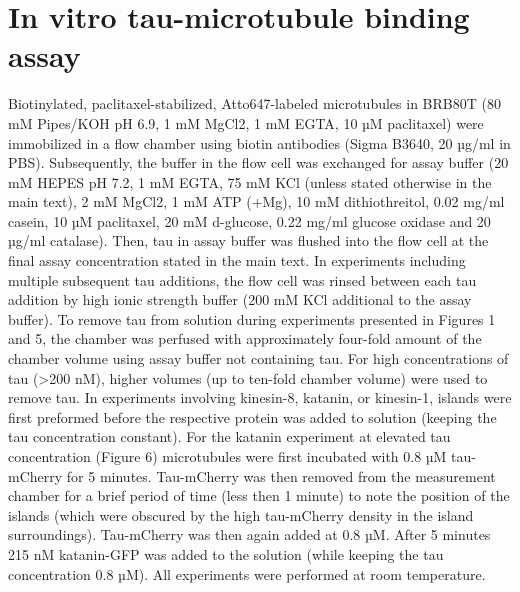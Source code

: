 \section{In vitro tau-microtubule binding assay}
Biotinylated, paclitaxel-stabilized, Atto647-labeled microtubules in BRB80T (80 mM Pipes/KOH pH 6.9, 1 mM MgCl2, 1 mM EGTA, 10 µM paclitaxel) were immobilized in a flow chamber using biotin antibodies (Sigma B3640, 20 µg/ml in PBS). Subsequently, the buffer in the flow cell was exchanged for assay buffer (20 mM HEPES pH 7.2, 1 mM EGTA, 75 mM KCl (unless stated otherwise in the main text), 2 mM MgCl2, 1 mM ATP (+Mg), 10 mM dithiothreitol, 0.02 mg/ml casein, 10 µM paclitaxel, 20 mM d-glucose, 0.22 mg/ml glucose oxidase and 20 µg/ml catalase). Then, tau in assay buffer was flushed into the flow cell at the final assay concentration stated in the main text. In experiments including multiple subsequent tau additions, the flow cell was rinsed between each tau addition by high ionic strength buffer (200 mM KCl additional to the assay buffer). To remove tau from solution during experiments presented in Figures 1 and 5, the chamber was perfused with approximately four-fold amount of the chamber volume using assay buffer not containing tau. For high concentrations of tau (>200 nM), higher volumes (up to ten-fold chamber volume) were used to remove tau. In experiments involving kinesin-8, katanin, or kinesin-1, islands were first preformed before the respective protein was added to solution (keeping the tau concentration constant). For the katanin experiment at elevated tau concentration (Figure 6) microtubules were first incubated with 0.8 µM tau-mCherry for 5 minutes. Tau-mCherry was then removed from the measurement chamber for a brief period of time (less then 1 minute) to note the position of the islands (which were obscured by the high tau-mCherry density in the island surroundings). Tau-mCherry was then again added at 0.8 µM. After 5 minutes 215 nM katanin-GFP was added to the solution (while keeping the tau concentration 0.8 µM). All experiments were performed at room temperature. 

